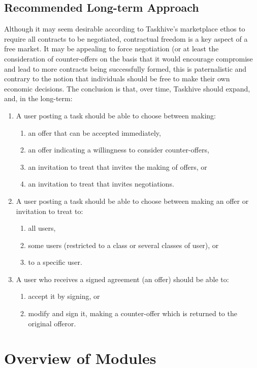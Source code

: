 \documentclass[a4paper,12pt]{article}
\begin{document}
\subsection{Recommended Long-term Approach}

Although it may seem desirable according to Taskhive's marketplace ethos to require all contracts to be negotiated, contractual freedom is a key aspect of a free market. It may be appealing to force negotiation (or at least the consideration of counter-offers on the basis that it would encourage compromise and lead to more contracts being successfully formed, this is paternalistic and contrary to the notion that individuals should be free to make their own economic decisions. The conclusion is that, over time, Taskhive should expand, and, in the long-term:

\begin{enumerate}
	\item A user posting a task should be able to choose between making:
	\begin{enumerate}
		\item an offer that can be accepted immediately,
		\item an offer indicating a willingness to consider counter-offers,
		\item an invitation to treat that invites the making of offers, or
		\item an invitation to treat that invites negotiations.
	\end{enumerate}
	\item A user posting a task should be able to choose between making an offer or invitation to treat to:
	\begin{enumerate}
		\item all users,
		\item some users (restricted to a class or several classes of user), or
		\item to a specific user.
	\end{enumerate}
	\item A user who receives a signed agreement (an offer) should be able to:
	\begin{enumerate}
		\item accept it by signing, or
		\item modify and sign it, making a counter-offer which is returned to the original offeror.
	\end{enumerate}
\end{enumerate}

\section{Overview of Modules}
\end{document}
